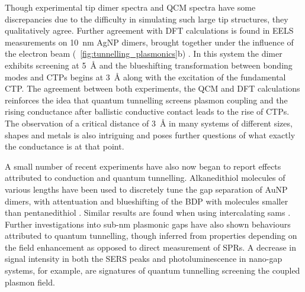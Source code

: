 \documentclass{article}
\begin{document}
Though experimental tip dimer spectra and QCM spectra have some discrepancies due to the difficulty in simulating such large tip structures, they qualitatively agree. Further agreement with DFT calculations is found in EELS measurements on \SI{10}{nm} AgNP dimers, brought together under the influence of the electron beam (\figurename~\ref{fig:tunnelling_plasmonics}b) \cite{scholl2013}. In this system the dimer exhibits screening at \SI{5}{\angstrom} and the blueshifting transformation between bonding modes and CTPs begins at \SI{3}{\angstrom} along with the excitation of the fundamental CTP. The agreement between both experiments, the QCM and DFT calculations reinforces the idea that quantum tunnelling screens plasmon coupling and the rising conductance after ballistic conductive contact leads to the rise of CTPs. The observation of a critical distance of \SI{3}{\angstrom} in many systems of different sizes, shapes and metals is also intriguing and poses further questions of what exactly the conductance is at that point.

A small number of recent experiments have also now began to report effects attributed to conduction and quantum tunnelling. Alkanedithiol molecules of various lengths have been used to discretely tune the gap separation of AuNP dimers, with attentuation and blueshifting of the BDP with molecules smaller than pentanedithiol \cite{cha2014}. Similar results are found when using intercalating \glspl{sam} \cite{tan2014}.
Further investigations into sub-nm plasmonic gaps have also shown behaviours attributed to quantum tunnelling, though inferred from properties depending on the field enhancement as opposed to direct measurement of SPRs. A decrease in signal intensity in both the SERS peaks \cite{zhu2014} and photoluminescence \cite{kravtsov2014} in nano-gap systems, for example, are signatures of quantum tunnelling screening the coupled plasmon field.
\end{document}
